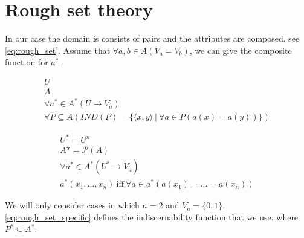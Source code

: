 \documentclass[11pt,a4paper,notitlepage,onecolumn,twoside]{article}
\newtheorem{definition}{Definition}
\begin{document}

\section{Rough set theory}
\label{sec:rough_set_theory}

In our case the domain is consists of pairs and the attributes are composed, see \ref{eq:rough_set}. Assume that $\forall a,b \in A (V_a = V_b)$, we can give the composite function for $a^*$.

\begin{align}
\label{eq:rough_set_classic}
U \\
A \\
\forall a^* \in A^* (U \rightarrow V_a) \\
\forall P \subseteq A (
    IND(P) = \{
      \langle x, y \rangle
    \  \vert \ 
      \forall a \in P (a(x) = a(y))
    \}
  )
\end{align}

\begin{align}
\label{eq:rough_set_generic}
U^* = U^n \\
A* = \mathcal{P}(A) \\
\forall a^* \in A^* (U^* \rightarrow V_a) \\
a^*(x_1, \ldots, x_n) \  \text{iff} \  \forall a \in a^* (a(x_1) = \ldots = a(x_n))
\end{align}

We will only consider cases in which $n = 2$ and $V_a = \{ 0, 1 \}$. \ref{eq:rough_set_specific} defines the indiscernability function that we use, where $P^* \subseteq A^*$.
\end{document}
